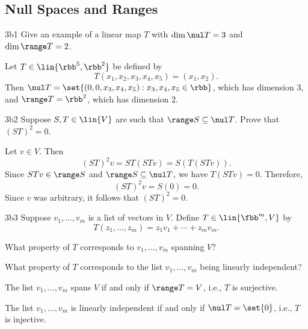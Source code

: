\subsection{Null Spaces and Ranges}

\begin{exercise}{3b1}
    Give an example of a linear map $T$ with $\dim \nul T = 3$ and $\dim \range T = 2$.
\end{exercise}

\begin{sol}
    Let $T \in \lin{\rbb^5, \rbb^2}$ be defined by
    \[
    	T(x_1, x_2, x_3, x_4, x_5) = (x_1, x_2).
    \]
    Then $\nul T = \set{(0, 0, x_3, x_4, x_5) : x_3, x_4, x_5 \in \rbb}$, which has dimension $3$, and $\range T = \rbb^2$, which has dimension $2$.
\end{sol}

\begin{exercise}{3b2}
    Suppose $S, T \in \lin{V}$ are such that $\range S \subseteq \nul T$.
	Prove that $(ST)^2 = 0$.
\end{exercise}

\begin{sol}
    Let $v \in V$.
	Then
    \[
    	(ST)^2 v = ST(STv) = S(T(STv)).
    \]
    Since $STv \in \range S$ and $\range S \subseteq \nul T$, we have $T(STv) = 0$.
	Therefore,
    \[
    	(ST)^2 v = S(0) = 0.
    \]
    Since $v$ was arbitrary, it follows that $(ST)^2 = 0$.
\end{sol}

\begin{exercise}{3b3}
    Suppose $v_1, \ldots, v_m$ is a list of vectors in $V$.
	Define $T \in \lin{\fbb^m, V}$ by
    \[
    	T(z_1, \ldots, z_m) = z_1 v_1 + \cdots + z_m v_m.
    \]
    \begin{subexercises}
        \item What property of $T$ corresponds to $v_1, \ldots, v_m$ spanning $V$?
        \item What property of $T$ corresponds to the list $v_1, \ldots, v_m$ being linearly independent?
    \end{subexercises}
\end{exercise}

\begin{solenum}
    \item The list $v_1, \ldots, v_m$ spans $V$ if and only if $\range T = V$, i.e., $T$ is surjective.
    \item The list $v_1, \ldots, v_m$ is linearly independent if and only if $\nul T = \set{0}$, i.e., $T$ is injective.
\end{solenum}

